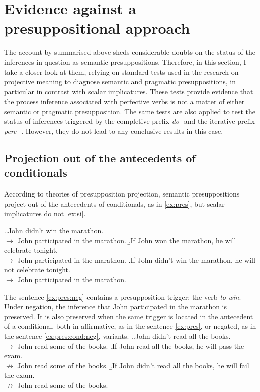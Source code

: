\section{Evidence against a presuppositional approach}\label{sec:pragm:tests}
The account by \citet{Gronn:04, Gronn:06} summarised above sheds considerable doubts on the status of the inferences in question as semantic presuppositions. Therefore, in this section, I take a closer look at them, relying on standard tests used in the research on projective meaning to diagnose semantic and pragmatic presuppositions, in particular in contrast with scalar implicatures. These tests provide evidence that the process inference associated with perfective verbs  is not a matter of either semantic or pragmatic presupposition. The same tests are also applied to test the status of inferences triggered by the completive  prefix \textit{do-}   and the iterative prefix \textit{pere-}  . However, they do not lead to any conclusive results in this case.
\subsection{Projection out of the antecedents of conditionals}
According to theories of presupposition projection, semantic presuppositions project out of the antecedents of conditionals, as in \ref{ex:pres}, but scalar implicatures do not \ref{ex:si}.

\ex.\a.\label{ex:pres:neg}John didn't win the marathon.\\
$\rightarrow$ John participated in the marathon.
\b.\label{ex:pres}If John won the marathon, he will celebrate tonight.\\
$\rightarrow$ John participated in the marathon.
\b.\label{ex:pres:cond:neg}If John didn't win the marathon, he will not celebrate tonight.\\
$\rightarrow$ John participated in the marathon.

The sentence \ref{ex:pres:neg} contains a presupposition trigger: the verb \textit{to win}. Under negation, the inference that John participated in the marathon is preserved. It is also preserved when the same trigger is located in the antecedent of a conditional, both in affirmative, as in the sentence \ref{ex:pres}, or negated, as in the sentence \ref{ex:pres:cond:neg}, variants.
\ex.\a.\label{ex:si:neg}John didn't read all the books.\\
$\rightarrow$ John read some of the books.
\b.\label{ex:si}If John read all the books, he will pass the exam.\\
$\nrightarrow$ John read some of the books.
\b.\label{ex:si:cond:neg}If John didn't read all the books, he will fail the exam.\\
$\nrightarrow$ John read some of the books.

